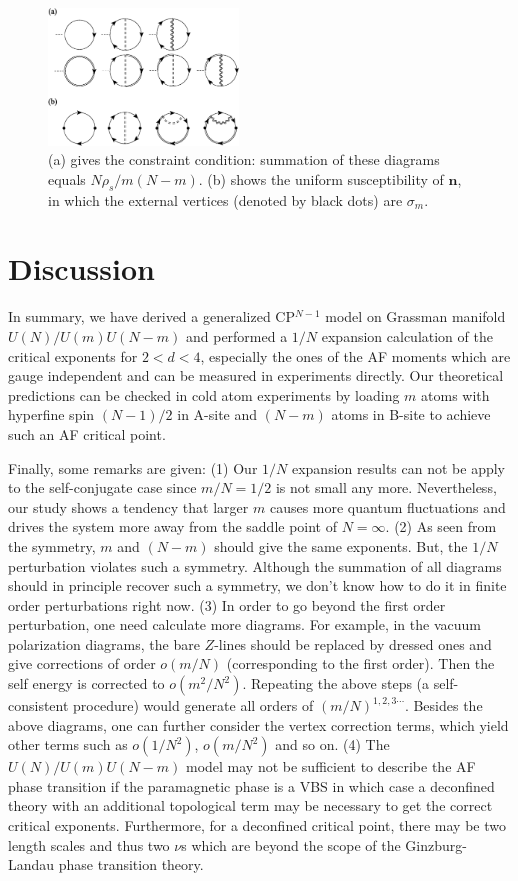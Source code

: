 \documentclass[aps,twocolumn,superscriptaddress]{revtex4-1}
\newcommand{\bn}{\mathbf{n}}
\begin{document}
\begin{figure}
\includegraphics[width=0.45\textwidth]{suscept.eps}
\caption{\label{fig:suscept} (a) gives the constraint condition: summation of these diagrams equals $N\rho_s/m(N-m)$. (b) shows the uniform susceptibility of $\bn$, in which the external vertices (denoted by black dots) are $\sigma_m$. }
\end{figure}

\section{Discussion}
In summary, we have derived a generalized CP$^{N-1}$ model on Grassman manifold $U(N)/U(m)U(N-m)$ and performed a $1/N$
expansion calculation of the critical exponents for $2<d<4$, especially the ones of the AF moments which are gauge independent and can be measured in experiments directly. Our theoretical predictions can be checked in cold atom experiments by loading $m$ atoms with hyperfine spin $(N-1)/2$ in A-site and $(N-m)$ atoms in B-site to achieve such an AF critical point.

Finally, some remarks are given:
(1) Our $1/N$ expansion results can not be apply to the self-conjugate case since $m/N=1/2$ is not small any more. Nevertheless, our study shows a tendency that larger $m$ causes more quantum fluctuations and drives the system more away from the saddle point of $N=\infty$.
(2) As seen from the symmetry, $m$ and $(N-m)$ should give the same exponents. But, the $1/N$ perturbation violates such a symmetry. Although the summation of all diagrams should in principle recover such a symmetry, we don't know how to do it in finite order perturbations right now. \cite{hikami1980}
(3) In order to go beyond the first order perturbation, one need calculate more diagrams. For example, in the vacuum polarization diagrams, the bare $Z$-lines should be replaced by dressed ones and give corrections of order $o(m/N)$ (corresponding to the first order). Then the self energy is corrected to $o(m^2/N^2)$. Repeating the above steps (a self-consistent procedure) would generate all orders of $(m/N)^{1,2,3\cdots}$. Besides the above diagrams, one can further consider the vertex correction terms, which yield other terms such as $o(1/N^2)$, $o(m/N^2)$ and so on.
(4) The $U(N)/U(m)U(N-m)$ model may not be sufficient to
describe the AF phase transition if the paramagnetic phase is a VBS in which case a deconfined theory with an additional
topological term may be necessary to get the correct critical exponents. \cite{senthil2004,motrunich2004} 
Furthermore, for a deconfined critical point, there may be two
length scales and thus two $\nu$s \cite{Shao2016} which are beyond the scope of the Ginzburg-Landau phase transition theory. 
\end{document}
